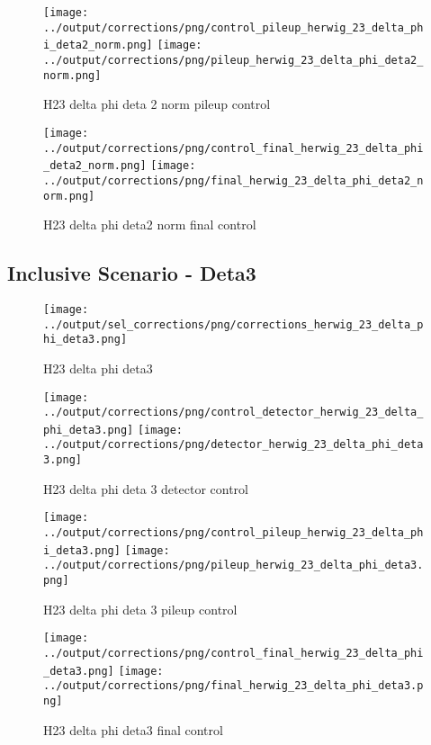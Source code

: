 \documentclass[11pt]{book}
\begin{document}
\begin{figure}[ht]
\centering
\texttt{[image: ../output/corrections/png/control\_pileup\_herwig\_23\_delta\_phi\_deta2\_norm.png]}
\texttt{[image: ../output/corrections/png/pileup\_herwig\_23\_delta\_phi\_deta2\_norm.png]}
\caption{H23 delta phi deta 2 norm pileup control}
\label{fig:H23_delta_phi_deta2_norm_pileup_control}
\end{figure}


\begin{figure}[ht]
\centering
\texttt{[image: ../output/corrections/png/control\_final\_herwig\_23\_delta\_phi\_deta2\_norm.png]}
\texttt{[image: ../output/corrections/png/final\_herwig\_23\_delta\_phi\_deta2\_norm.png]}
\caption{H23 delta phi deta2 norm final control}
\label{fig:H23_delta_phi_deta2_norm_final_control}
\end{figure}

\clearpage
\subsection{Inclusive Scenario - Deta3}
\begin{figure}[ht]
\centering
\texttt{[image: ../output/sel\_corrections/png/corrections\_herwig\_23\_delta\_phi\_deta3.png]}
\caption{H23 delta phi deta3}
\label{fig:H23_delta_phi_deta3}
\end{figure}


\begin{figure}[ht]
\centering
\texttt{[image: ../output/corrections/png/control\_detector\_herwig\_23\_delta\_phi\_deta3.png]}
\texttt{[image: ../output/corrections/png/detector\_herwig\_23\_delta\_phi\_deta3.png]}
\caption{H23 delta phi deta 3 detector control}
\label{fig:H23_delta_phi_deta3_detector_control}
\end{figure}

\begin{figure}[ht]
\centering
\texttt{[image: ../output/corrections/png/control\_pileup\_herwig\_23\_delta\_phi\_deta3.png]}
\texttt{[image: ../output/corrections/png/pileup\_herwig\_23\_delta\_phi\_deta3.png]}
\caption{H23 delta phi deta 3 pileup control}
\label{fig:H23_delta_phi_deta3_pileup_control}
\end{figure}


\begin{figure}[ht]
\centering
\texttt{[image: ../output/corrections/png/control\_final\_herwig\_23\_delta\_phi\_deta3.png]}
\texttt{[image: ../output/corrections/png/final\_herwig\_23\_delta\_phi\_deta3.png]}
\caption{H23 delta phi deta3 final control}
\label{fig:H23_delta_phi_deta3_final_control}
\end{figure}
\end{document}
